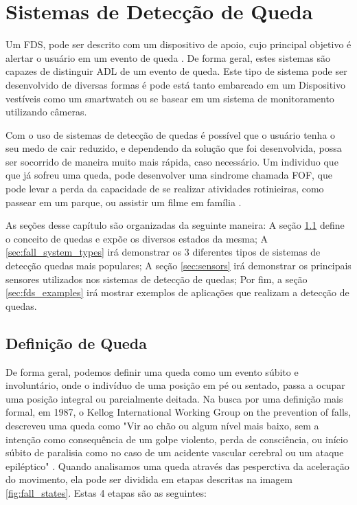 \chapter{Sistemas de Detecção de Queda}
\label{cap:sistemasRecomendacao}

Um \ac{FDS}, pode ser descrito com um dispositivo de apoio, cujo principal objetivo é alertar o usuário em um evento de queda \citep{igual2013challenges}. De forma geral, estes sistemas são capazes de distinguir \ac{ADL}  de um evento de queda. Este tipo de sistema pode ser desenvolvido de diversas formas é pode está tanto embarcado em um Dispositivo vestíveis como um smartwatch ou se basear em um sistema de monitoramento utilizando câmeras. 

Com o uso de sistemas de detecção de quedas é possível que o usuário tenha o seu medo de cair reduzido, e dependendo da solução que foi desenvolvida, possa ser socorrido de maneira muito mais rápida, caso necessário. Um individuo que que já sofreu uma queda, pode desenvolver uma sindrome chamada \ac{FOF}, que pode levar a perda da capacidade de se realizar atividades rotinieiras, como passear em um parque, ou assistir um filme em família \citep{legters2002fear}.

As seções desse capítulo são organizadas da seguinte maneira: A seção \ref{sec:fall_definition} define o conceito de quedas e expõe os diversos estados da mesma; A \ref{sec:fall_system_types} irá demonstrar os 3 diferentes tipos de sistemas de detecção quedas mais populares; A seção \ref{sec:sensors} irá demonstrar os principais sensores utilizados nos sistemas de detecção de quedas; Por fim, a seção \ref{sec:fds_examples}  irá mostrar exemplos de aplicações que realizam a detecção de quedas. 



\section{Definição de Queda}
\label{sec:fall_definition}
De forma geral, podemos definir uma queda como um evento súbito e involuntário, onde o indivíduo de uma posição em pé ou sentado, passa a ocupar uma posição integral ou parcialmente deitada. Na busca por uma definição mais formal, em 1987, o Kellog International Working Group on the prevention of falls, descreveu uma queda como "Vir ao chão ou algum nível mais baixo, sem a intenção como consequência de um golpe violento, perda de consciência, ou início súbito de paralisia como no caso de um acidente vascular cerebral ou um ataque epiléptico"  \citep{igual2013challenges}. Quando analisamos uma queda através das pesperctiva da aceleração do movimento, ela pode ser dividida em etapas descritas na imagem \ref{fig:fall_states}. Estas 4 etapas são as seguintes:


